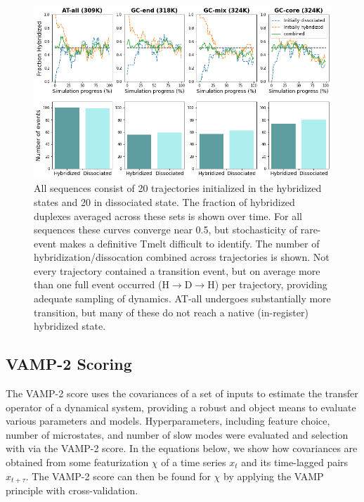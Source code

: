 \documentclass[journal=jpcbfk,manuscript=article]{achemso}
\begin{document}
\begin{figure}[ht!]
	\begin{center}
        \includegraphics[width=120mm, 
        scale=0.5]{Figs/figs_imp/allseq_event_count.png}
        \caption{All sequences consist of 20 trajectories initialized in the hybridized states and 20 in dissociated state. The fraction of hybridized duplexes averaged across these sets is shown over time. For all sequences these curves converge near 0.5, but stochasticity of rare-event makes a definitive Tmelt difficult to identify. The number of hybridization/dissocation combined across trajectories is shown. Not every trajectory contained a transition event, but on average more than one full event occurred (H$\rightarrow$D$\rightarrow$H) per trajectory, providing adequate sampling of dynamics. AT-all undergoes substantially more transition, but many of these do not reach a native (in-register) hybridized state.}
        \label{fig:allseq_event_count}
	\end{center}
\end{figure}

\subsection{VAMP-2 Scoring}
The VAMP-2 score uses the covariances of a set of inputs to estimate the transfer operator of a dynamical system, providing a robust and object means to evaluate various parameters and models. Hyperparameters, including feature choice, number of microstates, and number of slow modes were evaluated and selection with via the VAMP-2 score. In the equations below, we show how covariances are obtained from some featurization $\chi$ of a time series $x_t$ and its time-lagged pairs $x_{t+\tau}$. The VAMP-2 score can then be found for $\chi$ by applying the VAMP principle with cross-validation.
\end{document}

